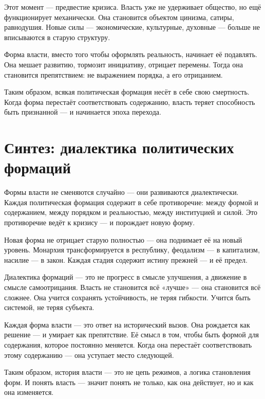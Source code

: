 Этот момент — предвестие кризиса. Власть уже не удерживает общество, но ещё функционирует механически. Она становится объектом цинизма, сатиры, равнодушия. Новые силы — экономические, культурные, духовные — больше не вписываются в старую структуру.

Форма власти, вместо того чтобы оформлять реальность, начинает её подавлять. Она мешает развитию, тормозит инициативу, отрицает перемены. Тогда она становится препятствием: не выражением порядка, а его отрицанием.

Таким образом, всякая политическая формация несёт в себе свою смертность. Когда форма перестаёт соответствовать содержанию, власть теряет способность быть признанной — и начинается эпоха перехода.

\section{Синтез: диалектика политических формаций}

Формы власти не сменяются случайно — они развиваются диалектически. Каждая политическая формация содержит в себе противоречие: между формой и содержанием, между порядком и реальностью, между институцией и силой. Это противоречие ведёт к кризису — и порождает новую форму.

Новая форма не отрицает старую полностью — она поднимает её на новый уровень. Монархия трансформируется в республику, феодализм — в капитализм, насилие — в закон. Каждая стадия содержит истину прежней — и её предел.

Диалектика формаций — это не прогресс в смысле улучшения, а движение в смысле самоотрицания. Власть не становится всё «лучше» — она становится всё сложнее. Она учится сохранять устойчивость, не теряя гибкости. Учится быть системой, не теряя субъекта.

Каждая форма власти — это ответ на исторический вызов. Она рождается как решение — и умирает как препятствие. Её смысл в том, чтобы быть формой для содержания, которое постоянно меняется. Когда она перестаёт соответствовать этому содержанию — она уступает место следующей.

Таким образом, история власти — это не цепь режимов, а логика становления форм. И понять власть — значит понять не только, как она действует, но и как она изменяется.
